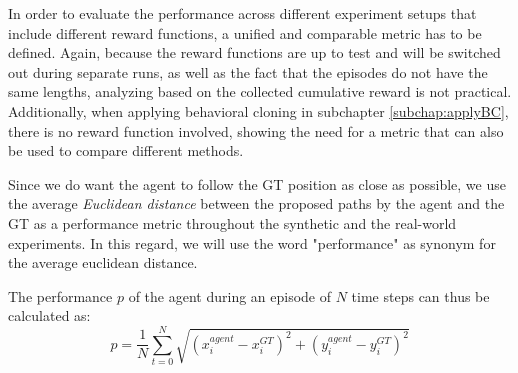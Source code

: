 In order to evaluate the performance across different experiment setups that include different reward functions, a unified and comparable metric has to be defined. Again, because the reward functions are up to test and will be switched out during separate runs, as well as the fact that the episodes do not have the same lengths, analyzing based on the collected cumulative reward is not practical. Additionally, when applying behavioral cloning in subchapter \ref{subchap:applyBC}, there is no reward function involved, showing the need for a metric that can also be used to compare different methods.
\par
Since we do want the agent to follow the GT position as close as possible, we use the average \textit{Euclidean distance} between the proposed paths by the agent and the GT as a performance metric throughout the synthetic and the real-world experiments. In this regard, we will use the word "performance" as synonym for the average euclidean distance.
\par
The performance $p$ of the agent during an episode of $N$ time steps can thus be calculated as:
\begin{equation}
    p = \frac{1}{N} \sum_{t=0}^{N}\sqrt{(x^{agent}_i - x^{GT}_i)^2 + (y^{agent}_i - y^{GT}_i)^2}
    \label{eq:euclid}
\end{equation}

